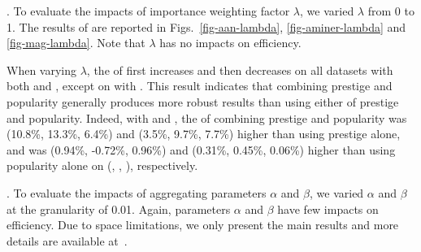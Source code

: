 .
To evaluate the impacts of importance weighting factor $\lambda$, we varied $\lambda$ from 0 to 1.
The results of \PairAcc are reported in Figs.~\ref{fig-aan-lambda}, \ref{fig-aminer-lambda} and \ref{fig-mag-lambda}. Note that $\lambda$ has no impacts on efficiency.

When varying $\lambda$, the \PairAcc of \ensemblerank first increases and then decreases on all datasets with both \fcita and \recom, except on \aminer with \recom. This result indicates that combining prestige and popularity generally produces more robust results than using either of prestige and popularity.
Indeed, with \recom and \fcita, the \PairAcc of combining prestige and popularity was (10.8\%, 13.3\%, 6.4\%) and (3.5\%, 9.7\%, 7.7\%) higher than using prestige alone, and was (0.94\%, -0.72\%, 0.96\%) and (0.31\%, 0.45\%, 0.06\%) higher than using popularity alone on (\aan, \aminer, \magdata), respectively.




.
To evaluate the impacts of aggregating parameters $\alpha$ and $\beta$, we varied $\alpha$ and $\beta$ at the granularity of 0.01.
Again, parameters $\alpha$ and $\beta$ have few impacts on efficiency. Due to space limitations, we only present the main results and more details are available at~\cite{SARank-full}.


